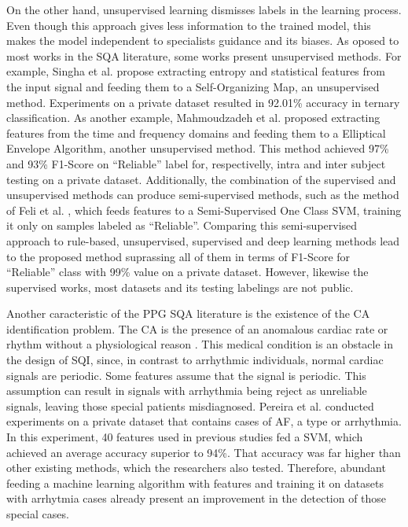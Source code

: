 On the other hand, unsupervised learning dismisses labels in the learning process. Even though this approach gives less information to the trained model, this makes the model independent to specialists guidance and its biases. As oposed to most works in the \gls{SQA} literature, some works present unsupervised methods. For example, Singha et al. \cite{ppg-sqa-4} propose extracting entropy and statistical features from the input signal and feeding them to a Self-Organizing Map, an unsupervised method. Experiments on a private dataset resulted in 92.01\% accuracy in ternary classification. As another example, Mahmoudzadeh et al. \cite{ppg-sqa-5} proposed extracting features from the time and frequency domains and feeding them to a Elliptical Envelope Algorithm, another unsupervised method. This method achieved 97\% and 93\% F1-Score on ``Reliable'' label for, respectivelly, intra and inter subject testing on a private dataset. Additionally, the combination of the supervised and unsupervised methods can produce semi-supervised methods, such as the method of Feli et al. \cite{ppg-sqa-6}, which feeds features to a Semi-Supervised One Class \gls{SVM}, training it only on samples labeled as ``Reliable''. Comparing this semi-supervised approach to rule-based, unsupervised, supervised and deep learning methods lead to the proposed method suprassing all of them in terms of F1-Score for ``Reliable'' class with 99\% value on a private dataset. However, likewise the supervised works, most datasets and its testing labelings are not public.		

Another caracteristic of the \gls{PPG} \gls{SQA} literature is the existence of the \gls{CA} identification problem. The \gls{CA} is the presence of an anomalous cardiac rate or rhythm without a physiological reason \cite{arrhythmia-1}. This medical condition is an obstacle in the design of \gls{SQI}, since, in contrast to arrhythmic individuals, normal cardiac signals are periodic. Some features assume that the signal is periodic. This assumption can result in signals with arrhythmia being reject as unreliable signals, leaving those special patients misdiagnosed. Pereira et al. \cite{arrhythmia-2} conducted experiments on a private dataset that contains cases of \gls{AF}, a type or arrhythmia. In this experiment, 40 features used in previous studies fed a \gls{SVM}, which achieved an average accuracy superior to 94\%. That accuracy was far higher than other existing methods, which the researchers also tested. Therefore, abundant feeding a machine learning algorithm with features and training it on datasets with arrhytmia cases already present an improvement in the detection of those special cases.

